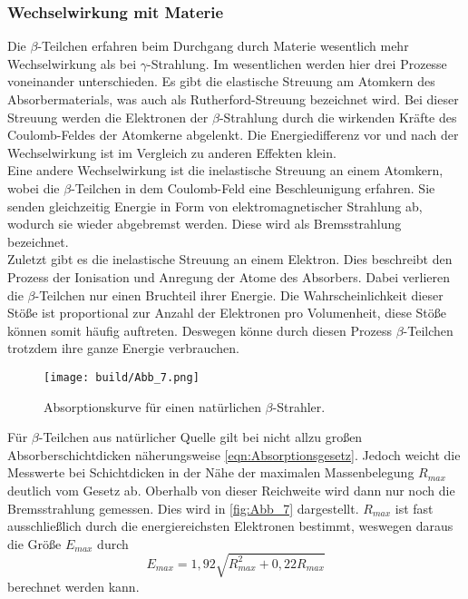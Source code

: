 \subsubsection{Wechselwirkung mit Materie}
\label{subsub: WeMaB}
Die $\beta$-Teilchen erfahren beim Durchgang durch Materie wesentlich mehr Wechselwirkung als bei $\gamma$-Strahlung.
Im wesentlichen werden hier drei Prozesse voneinander unterschieden.
Es gibt die elastische Streuung am Atomkern des Absorbermaterials, was auch als Rutherford-Streuung bezeichnet wird.
Bei dieser Streuung werden die Elektronen der $\beta$-Strahlung durch die wirkenden Kräfte des Coulomb-Feldes der Atomkerne abgelenkt.
Die Energiedifferenz vor und nach der Wechselwirkung ist im Vergleich zu anderen Effekten klein.\\
Eine andere Wechselwirkung ist die inelastische Streuung an einem Atomkern, wobei die $\beta$-Teilchen in dem Coulomb-Feld eine Beschleunigung erfahren.
Sie senden gleichzeitig Energie in Form von elektromagnetischer Strahlung ab, wodurch sie wieder abgebremst werden.
Diese wird als Bremsstrahlung bezeichnet.\\
Zuletzt gibt es die inelastische Streuung an einem Elektron.
Dies beschreibt den Prozess der Ionisation und Anregung der Atome des Absorbers. Dabei verlieren die $\beta$-Teilchen nur einen Bruchteil
ihrer Energie. Die Wahrscheinlichkeit dieser Stöße ist proportional zur Anzahl der Elektronen pro Volumenheit, diese Stöße können somit häufig auftreten.
Deswegen könne durch diesen Prozess $\beta$-Teilchen trotzdem ihre ganze Energie verbrauchen.\\

\begin{figure}[H]
    \centering
    \texttt{[image: build/Abb\_7.png]}
    \caption {Absorptionskurve für einen natürlichen $\beta$-Strahler\cite[241]{V704}.}
    \label{fig:Abb_7}
\end{figure}
Für $\beta$-Teilchen aus natürlicher Quelle gilt bei nicht allzu großen Absorberschichtdicken näherungsweise \autoref{eqn:Absorptionsgesetz}.
Jedoch weicht die Messwerte bei Schichtdicken in der Nähe der maximalen Massenbelegung $R_{max}$ deutlich vom Gesetz ab.
Oberhalb von dieser Reichweite wird dann nur noch die Bremsstrahlung gemessen. Dies wird in \autoref{fig:Abb_7} dargestellt.
$R_{max}$ ist fast ausschließlich durch die energiereichsten Elektronen bestimmt, weswegen daraus die Größe $E_{max}$ durch
\begin{equation}
    E_{max} = 1,92 \sqrt{R_{max}^2 + 0,22 R_{max}}
    \label{eqn:Emax}
\end{equation}
berechnet werden kann.

